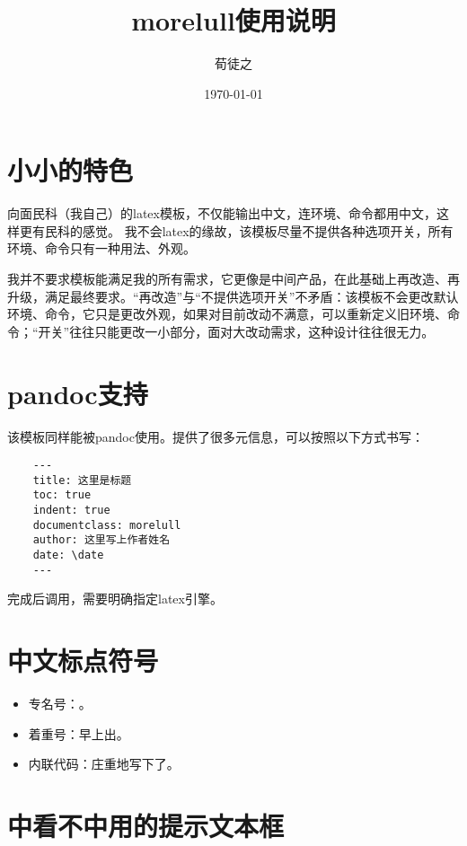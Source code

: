 \documentclass{morelull}
\title{morelull使用说明}
\author{荀徒之}
\date{\today}
\begin{document}
\maketitle
\tableofcontents

\section{小小的特色}
向面民科（我自己）的latex模板，不仅能输出中文，连环境、命令都用中文，这样更有民科的感觉。
我不会latex的缘故，该模板尽量不提供各种选项开关，所有环境、命令只有一种用法、外观。

我并不要求模板能满足我的所有需求，它更像是中间产品，在此基础上再改造、再升级，满足最终要求。“再改造”与“不提供选项开关”不矛盾：该模板不会更改默认环境、命令，它只是更改外观，如果对目前改动不满意，可以重新定义旧环境、命令；“开关”往往只能更改一小部分，面对大改动需求，这种设计往往很无力。

\section{pandoc支持}

该模板同样能被pandoc使用。提供了很多元信息，可以按照以下方式书写：

\begin{lstlisting}
    ---
    title: 这里是标题
    toc: true
    indent: true
    documentclass: morelull
    author: 这里写上作者姓名
    date: \date
    ---
\end{lstlisting}

完成后调用，需要明确指定latex引擎。

\section{中文标点符号}

\begin{itemize}
\item{专名号：。}
\item{着重号：早上出。}
\item{内联代码：庄重地写下了。}
\end{itemize}

\section{中看不中用的提示文本框}
\end{document}
